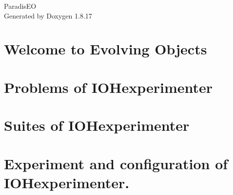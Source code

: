 \let\mypdfximage\pdfximage\def\pdfximage{\immediate\mypdfximage}\documentclass[twoside]{book}
\newcommand{\+}{\discretionary{\mbox{\scriptsize$\hookleftarrow$}}{}{}}
\newcommand{\clearemptydoublepage}{%
  \newpage{\pagestyle{empty}\cleardoublepage}%
}
\begin{document}
\hypersetup{pageanchor=false,
             bookmarksnumbered=true,
             pdfencoding=unicode
            }
\begin{titlepage}
\vspace*{7cm}
\begin{center}%
{\Large Paradis\+EO }\\
\vspace*{1cm}
{\large Generated by Doxygen 1.8.17}\\
\end{center}
\end{titlepage}
\clearemptydoublepage
{}
\tableofcontents
\clearemptydoublepage
{}
\hypersetup{pageanchor=true}

\chapter{Welcome to Evolving Objects}
\label{index}\hypertarget{index}{}
\chapter{Problems of I\+O\+Hexperimenter}
\label{md__home_aaziz-alaoui__documents__p_f_e__x__paradis_e_o__resources_paradiseo-master_eo_src__i_o_h__problems__r_e_a_d_m_e}

\chapter{Suites of I\+O\+Hexperimenter}
\label{md__home_aaziz-alaoui__documents__p_f_e__x__paradis_e_o__resources_paradiseo-master_eo_src__i_o_h__suites__r_e_a_d_m_e}

\chapter{Experiment and configuration of I\+O\+Hexperimenter.}
\label{md__home_aaziz-alaoui__documents__p_f_e__x__paradis_e_o__resources_paradiseo-master_eo_src__i_o_32cbb4b49118a45ffa0ba28813d2a6e5}

\end{document}
